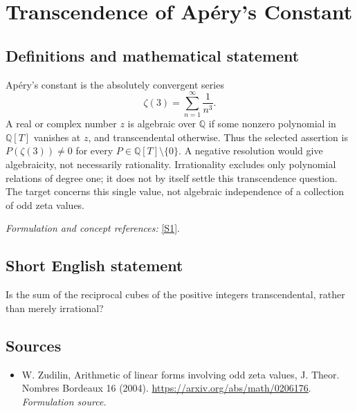 \documentclass[11pt]{article}
\begin{document}
\section*{\texorpdfstring{Transcendence of Apéry's Constant}{Transcendence of Apéry's Constant}}\label{1283}
\subsection{Definitions and mathematical statement}
Ap\'ery's constant is the absolutely convergent series
\[
 \zeta(3)=\sum_{n=1}^{\infty}\frac1{n^3}.
\]
A real or complex number $z$ is algebraic over ${\mathbb{Q}}$ if some nonzero polynomial in ${\mathbb{Q}}[T]$ vanishes at $z$, and transcendental otherwise. Thus the selected assertion is
$P(\zeta(3))\ne0$ for every $P\in{\mathbb{Q}}[T]\setminus\{0\}$.
A negative resolution would give algebraicity, not necessarily rationality. Irrationality excludes only polynomial relations of degree one; it does not by itself settle this transcendence question. The target concerns this single value, not algebraic independence of a collection of odd zeta values.
\par\smallskip\textit{Formulation and concept references:} \href{https://arxiv.org/abs/math/0206176}{[S1]}.

\subsection{Short English statement}
Is the sum of the reciprocal cubes of the positive integers transcendental, rather than merely irrational?
\subsection{Sources}
\begin{itemize}
\item[S1]W. Zudilin, Arithmetic of linear forms involving odd zeta values, J. Theor. Nombres Bordeaux 16 (2004).
\url{https://arxiv.org/abs/math/0206176}.
\textit{Formulation source.}
\end{itemize}
\end{document}
